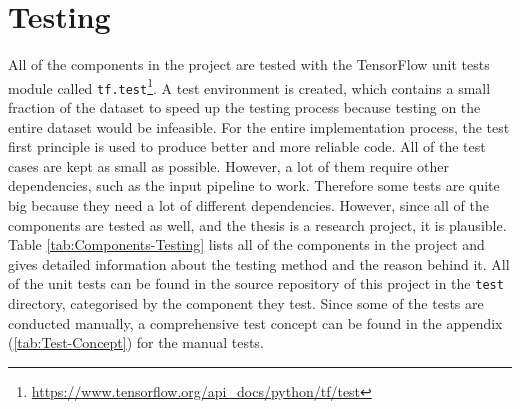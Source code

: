 \section{Testing}
\label{sec:Testing}
All of the components in the project are tested with the TensorFlow unit tests module called \texttt{tf.test}\footnote{\url{https://www.tensorflow.org/api_docs/python/tf/test}}. A test environment is created, which contains a small fraction of the dataset to speed up the testing process because testing on the entire dataset would be infeasible. For the entire implementation process, the test first principle is used to produce better and more reliable code. All of the test cases are kept as small as possible. However, a lot of them require other dependencies, such as the input pipeline to work. Therefore some tests are quite big because they need a lot of different dependencies. However, since all of the components are tested as well, and the thesis is a research project, it is plausible.
\newline
\newline
Table \ref{tab:Components-Testing} lists all of the components in the project and gives detailed information about the testing method and the reason behind it. All of the unit tests can be found in the source repository of this project in the \texttt{test} directory, categorised by the component they test. Since some of the tests are conducted manually, a comprehensive test concept can be found in the appendix (\ref{tab:Test-Concept}) for the manual tests.
